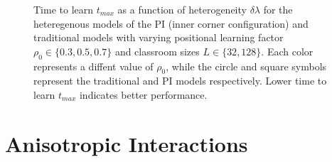 \begin{figure}[htbp!]
   \centering
   \caption{Time to learn $t_{max}$ as a function of heterogeneity $\delta\lambda$ for the heteregenous models of the PI (inner corner configuration) and traditional models with varying positional learning factor $\rho_0\in\lbrace 0.3,0.5,0.7 \rbrace$ and classroom sizes $L\in\lbrace32,128\rbrace$. 
   Each color represents a diffent value of $\rho_0$, while the circle and square symbols represent the traditional and PI models respectively.
   Lower time to learn $t_{max}$ indicates better performance.
   }
   \label{fig:2DBPCAIH dl-t plots}
\end{figure}

\newpage %

\section{Anisotropic Interactions}
